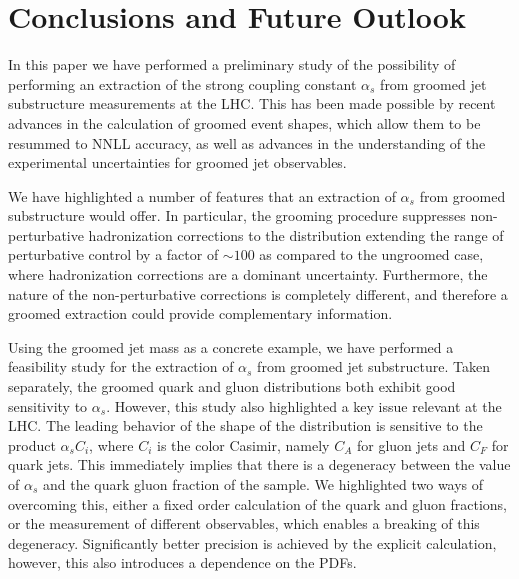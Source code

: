 \documentclass[11pt,letterpaper]{article}
\newcommand{\info}[1]{\textbf{\textcolor{mildred}{(#1)}}}
\begin{document}
%


%


%

\clearpage

\section{Conclusions and Future Outlook}
\label{sec:future}

In this paper we have performed a preliminary study of the possibility of performing an extraction of the strong coupling constant $\alpha_s$ from groomed jet substructure measurements at the LHC.  This has been made possible by recent advances in the calculation of groomed event shapes, which allow them to be resummed to NNLL accuracy, as well as advances in the understanding of the experimental uncertainties for groomed jet observables. 

We have highlighted a number of features that an extraction of $\alpha_s$ from groomed substructure would offer. In particular, the grooming procedure suppresses non-perturbative hadronization corrections to the distribution extending the range of perturbative control by a factor of $\sim 100$ as compared to the ungroomed case, where hadronization corrections are a dominant uncertainty. Furthermore, the nature of the non-perturbative corrections is completely different, and therefore a groomed extraction could provide complementary information. 

Using the groomed jet mass as a concrete example, we have performed a feasibility study for the extraction of $\alpha_s$ from groomed jet substructure. Taken separately, the groomed quark and gluon distributions both exhibit good sensitivity to $\alpha_s$. However, this study also highlighted a key issue relevant at the LHC. The leading behavior of the shape of the distribution is sensitive to the product $\alpha_s C_i$, where $C_i$ is the color Casimir, namely $C_A$ for gluon jets and $C_F$ for quark jets. This immediately implies that there is a degeneracy between the value of $\alpha_s$ and the quark gluon fraction of the sample. We highlighted two ways of overcoming this, either a fixed order calculation of the quark and gluon fractions, or the measurement of different observables, which enables a breaking of this degeneracy. Significantly better precision is achieved by the explicit calculation, however, this also introduces a dependence on the PDFs.
\end{document}
